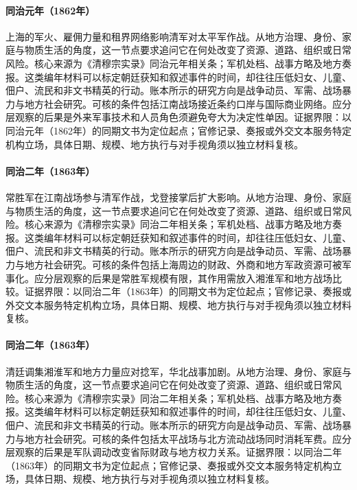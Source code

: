 \hypertarget{social:EQ-1862-SHANGHAI-FOREIGN-ARMS}{}\paragraph{同治元年（1862年）}上海的军火、雇佣力量和租界网络影响清军对太平军作战。从地方治理、身份、家庭与物质生活的角度，这一节点要求追问它在何处改变了资源、道路、组织或日常风险。核心来源为《清穆宗实录》同治元年相关条；军机处档、战事方略及地方奏报。这类编年材料可以标定朝廷获知和叙述事件的时间，却往往压低妇女、儿童、佃户、流民和非文书精英的行动。账本所示的研究方向是战争动员、军需、战场暴力与地方社会研究。可核的条件包括江南战场接近条约口岸与国际商业网络。应分层观察的后果是外来军事技术和人员角色须避免夸大为决定性单因。证据界限：以同治元年（1862年）的同期文书为定位起点；官修记录、奏报或外交文本服务特定机构立场，具体日期、规模、地方执行与对手视角须以独立材料复核。
\hypertarget{social:EQ-1863-EVER-VICTORIOUS-ARMY}{}\paragraph{同治二年（1863年）}常胜军在江南战场参与清军作战，戈登接掌后扩大影响。从地方治理、身份、家庭与物质生活的角度，这一节点要求追问它在何处改变了资源、道路、组织或日常风险。核心来源为《清穆宗实录》同治二年相关条；军机处档、战事方略及地方奏报。这类编年材料可以标定朝廷获知和叙述事件的时间，却往往压低妇女、儿童、佃户、流民和非文书精英的行动。账本所示的研究方向是战争动员、军需、战场暴力与地方社会研究。可核的条件包括上海周边的财政、外商和地方军政资源可被军事化。应分层观察的后果是常胜军规模有限，其作用需放入湘淮军和地方战场比较。证据界限：以同治二年（1863年）的同期文书为定位起点；官修记录、奏报或外交文本服务特定机构立场，具体日期、规模、地方执行与对手视角须以独立材料复核。
\hypertarget{social:EQ-1863-NIAN-WAR-MOBILIZATION}{}\paragraph{同治二年（1863年）}清廷调集湘淮军和地方力量应对捻军，华北战事加剧。从地方治理、身份、家庭与物质生活的角度，这一节点要求追问它在何处改变了资源、道路、组织或日常风险。核心来源为《清穆宗实录》同治二年相关条；军机处档、战事方略及地方奏报。这类编年材料可以标定朝廷获知和叙述事件的时间，却往往压低妇女、儿童、佃户、流民和非文书精英的行动。账本所示的研究方向是战争动员、军需、战场暴力与地方社会研究。可核的条件包括太平战场与北方流动战场同时消耗军费。应分层观察的后果是军队调动改变省际财政与地方权力关系。证据界限：以同治二年（1863年）的同期文书为定位起点；官修记录、奏报或外交文本服务特定机构立场，具体日期、规模、地方执行与对手视角须以独立材料复核。
